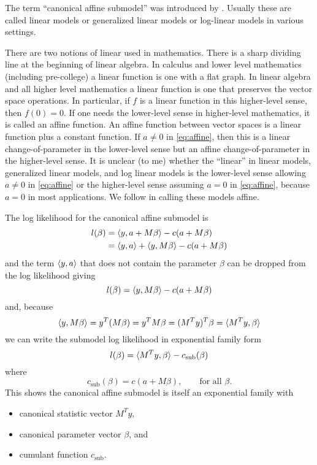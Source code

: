 The term ``canonical affine submodel'' was introduced by \citet{aster1}.
Usually these are called linear models or generalized linear models or
log-linear models in various settings.

There are two notions of linear used in mathematics.  There is a
sharp dividing line at the beginning of linear algebra.  In calculus
and lower level mathematics (including pre-college) a linear function
is one with a flat graph.  In linear algebra and all higher level mathematics
a linear function is one that preserves the vector space operations.
In particular, if $f$ is a linear function in this higher-level sense,
then $f(0) = 0$.  If one needs the lower-level sense in higher-level
mathematics, it is called an affine function.  An affine function
between vector spaces is
a linear function plus a constant function.  If $a \neq 0$
in \eqref{eq:affine}, then this is a linear change-of-parameter in the
lower-level sense but an affine change-of-parameter in the higher-level sense.
It is unclear (to me) whether the ``linear'' in linear models, generalized
linear models, and log linear models is the lower-level sense allowing
$a \neq 0$ in \eqref{eq:affine} or the higher-level sense assuming $a = 0$
in \eqref{eq:affine}, because $a = 0$ in most applications.
We follow \citet{aster1} in calling these models affine.

The log likelihood for the canonical affine submodel is
\begin{align*}
   l(\beta)
   & =
   \langle y, a + M \beta \rangle - c(a + M \beta)
   \\
   & =
   \langle y, a \rangle + \langle y, M \beta \rangle - c(a + M \beta)
\end{align*}
and the term $\langle y, a \rangle$ that does not contain the parameter $\beta$
can be dropped from the log likelihood giving
$$
   l(\beta)
   =
   \langle y, M \beta \rangle - c(a + M \beta)
$$
and, because
$$
   \langle y, M \beta \rangle = y^T (M \beta) = y^T M \beta = (M^T y)^T \beta
   = \langle M^T y, \beta \rangle
$$
we can write the submodel log likelihood in exponential family form
\begin{equation} \label{eq:submodel}
   l(\beta)
   =
   \langle M^T y, \beta \rangle - c_\text{sub}(\beta)
\end{equation}
where
\begin{equation} \label{eq:submodel-cumfun}
   c_\text{sub}(\beta)
   =
   c(a + M \beta), \qquad \text{for all $\beta$}.
\end{equation}
This shows the canonical affine submodel is itself an exponential family with
\begin{itemize}
\item canonical statistic vector $M^T y$,
\item canonical parameter vector $\beta$, and
\item cumulant function $c_\text{sub}$.
\end{itemize}

